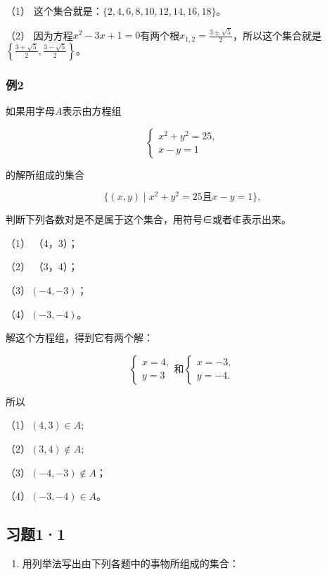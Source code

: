  （1）
这个集合就是：\(\{2, 4, 6, 8, 10, 12, 14, 16, 18\}\)。

（2）
因为方程\(x^{2} - 3x + 1 = 0\)有两个根\(x_{1,2} = \frac{3 \pm \sqrt{5}}{2}\)，所以这个集合就是\(\left\{\frac{3 + \sqrt{5}}{2}, \frac{3 - \sqrt{5}}{2}\right\}\)。

\subsubsection{例2}

如果用字母\(A\)表示由方程组

\[
\left\{ \begin{array}{l} x^{2} + y^{2} = 25, \\ x - y = 1 \end{array} \right.
\]

的解所组成的集合

\[
\{(x, y) \mid x^{2} + y^{2} = 25 \text{且} x - y = 1 \},
\]

判断下列各数对是不是属于这个集合，用符号∈或者∉表示出来。

（1） （4，3）；

（2） （3，4）；

（3）\((-4,-3)\)；

（4）\((-3,-4)\)。

 解这个方程组，得到它有两个解：

\[
\left\{ \begin{array}{ll} x = 4, \\ y = 3 \end{array} \right. \text{和} \left\{ \begin{array}{ll} x = - 3, \\ y = - 4. \end{array} \right.
\]

所以

（1）\((4,3)\in A;\)

（2）\((3,4)\notin A;\)

（3）\((-4, -3) \notin A\)；

（4）\((-3, -4) \in A\)。

\subsection{习题1·1}

\begin{enumerate}
\item
  用列举法写出由下列各题中的事物所组成的集合：
\end{enumerate}

